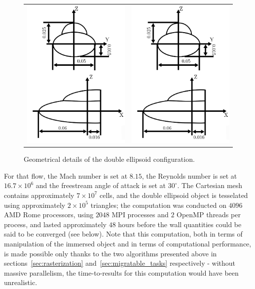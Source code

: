 \begin{figure}[ht!]
    \centering
    \begin{tabular}{cc}
        \includegraphics[width=0.35\linewidth]{chapter3_numerical_methods/pictures/ellipse_part1.pdf} &
        \includegraphics[width=0.45\linewidth]{chapter3_numerical_methods/pictures/ellipse_part2.pdf}
    \end{tabular}
    \caption{Geometrical details of the double ellipsoid configuration.}
    \label{fig:ellipse_geom}
\end{figure}

For that flow, the Mach number is set at $8.15$, the Reynolds number is set at $16.7\times 10^6$ and the freestream angle of attack is set at $30^{\circ}$.
The Cartesian mesh contains approximately $7\times 10^7$ cells, and the double ellipsoid object is tesselated using approximately $2\times 10^5$ triangles; the computation was conducted on $4096$ AMD Rome processors, using $2048$ MPI processes and $2$ OpenMP threads per process, and lasted approximately $48$ hours before the wall quantities could be said to be converged (see below).
Note that this computation, both in terms of manipulation of the immersed object and in terms of computational performance, is made possible only thanks to the two algorithms presented above in sections~\ref{sec:rasterization} and~\ref{sec:migratable_tasks} respectively - without massive parallelism, the time-to-results for this computation would have been unrealistic.

